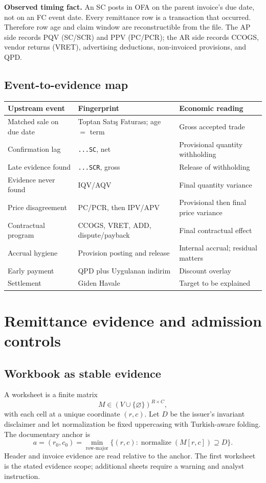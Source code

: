 \documentclass[11pt,a4paper]{article}
\theoremstyle{definition}
\begin{document}
\textbf{Observed timing fact.} An SC posts in OFA on the parent invoice's
due date, not on an FC event date. Every remittance row is a transaction
that occurred. Therefore row age and claim window are reconstructible
from the file. The AP side records PQV (SC/SCR) and PPV (PC/PCR); the AR
side records CCOGS, vendor returns (VRET), advertising deductions,
non-invoiced provisions, and QPD.

\subsection{Event-to-evidence map}
\begin{longtable}{@{}p{}p{}p{}@{}}
\toprule
\textbf{Upstream event} & \textbf{Fingerprint} & \textbf{Economic reading}\\
\midrule
\endhead
Matched sale on due date & Toptan Satış Faturası; age $=$ term & Gross accepted trade\\
Confirmation lag & \texttt{...SC}, net & Provisional quantity withholding\\
Late evidence found & \texttt{...SCR}, gross & Release of withholding\\
Evidence never found & IQV/AQV & Final quantity variance\\
Price disagreement & PC/PCR, then IPV/APV & Provisional then final price variance\\
Contractual program & CCOGS, VRET, ADD, dispute/payback & Final contractual effect\\
Accrual hygiene & Provision posting and release & Internal accrual; residual matters\\
Early payment & QPD plus Uygulanan indirim & Discount overlay\\
Settlement & Giden Havale & Target to be explained\\
\bottomrule
\end{longtable}

\section{Remittance evidence and admission controls}
\subsection{Workbook as stable evidence}
A worksheet is a finite matrix
\[
M\in(V\cup\{\varnothing\})^{R\times C},
\]
with each cell at a unique coordinate $(r,c)$. Let $D$ be the issuer's
invariant disclaimer and let normalization be fixed uppercasing with
Turkish-aware folding. The documentary anchor is
\[
a=(r_0,c_0)=\min_{\text{row-major}}
\{(r,c):\operatorname{normalize}(M[r,c])\supseteq D\}.
\]
Header and invoice evidence are read relative to the anchor. The first
worksheet is the stated evidence scope; additional sheets require a
warning and analyst instruction.
\end{document}
